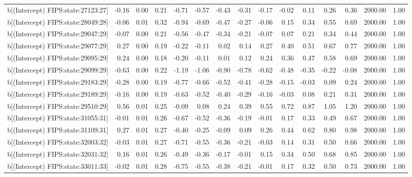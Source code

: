 \begin{table}[ht]
\begin{tabular}{rrrrrrrrrrrrrrr}
  b[(Intercept) FIPS:state:27123:27] & -0.16 & 0.00 & 0.21 & -0.71 & -0.57 & -0.43 & -0.31 & -0.17 & -0.02 & 0.11 & 0.26 & 0.36 & 2000.00 & 1.00 \\ 
  b[(Intercept) FIPS:state:28049:28] & -0.06 & 0.01 & 0.32 & -0.94 & -0.69 & -0.47 & -0.27 & -0.06 & 0.15 & 0.34 & 0.55 & 0.69 & 2000.00 & 1.00 \\ 
  b[(Intercept) FIPS:state:29047:29] & -0.07 & 0.00 & 0.21 & -0.56 & -0.47 & -0.34 & -0.21 & -0.07 & 0.07 & 0.21 & 0.34 & 0.44 & 2000.00 & 1.00 \\ 
  b[(Intercept) FIPS:state:29077:29] & 0.27 & 0.00 & 0.19 & -0.22 & -0.11 & 0.02 & 0.14 & 0.27 & 0.40 & 0.51 & 0.67 & 0.77 & 2000.00 & 1.00 \\ 
  b[(Intercept) FIPS:state:29095:29] & 0.24 & 0.00 & 0.18 & -0.20 & -0.11 & 0.01 & 0.12 & 0.24 & 0.36 & 0.47 & 0.58 & 0.69 & 2000.00 & 1.00 \\ 
  b[(Intercept) FIPS:state:29099:29] & -0.63 & 0.00 & 0.22 & -1.19 & -1.06 & -0.90 & -0.78 & -0.62 & -0.48 & -0.35 & -0.22 & -0.08 & 2000.00 & 1.00 \\ 
  b[(Intercept) FIPS:state:29183:29] & -0.28 & 0.00 & 0.19 & -0.77 & -0.66 & -0.52 & -0.41 & -0.28 & -0.15 & -0.03 & 0.09 & 0.24 & 2000.00 & 1.00 \\ 
  b[(Intercept) FIPS:state:29189:29] & -0.16 & 0.00 & 0.19 & -0.63 & -0.52 & -0.40 & -0.29 & -0.16 & -0.03 & 0.08 & 0.21 & 0.31 & 2000.00 & 1.00 \\ 
  b[(Intercept) FIPS:state:29510:29] & 0.56 & 0.01 & 0.25 & -0.09 & 0.08 & 0.24 & 0.39 & 0.55 & 0.72 & 0.87 & 1.05 & 1.20 & 2000.00 & 1.00 \\ 
  b[(Intercept) FIPS:state:31055:31] & -0.01 & 0.01 & 0.26 & -0.67 & -0.52 & -0.36 & -0.19 & -0.01 & 0.17 & 0.33 & 0.49 & 0.67 & 2000.00 & 1.00 \\ 
  b[(Intercept) FIPS:state:31109:31] & 0.27 & 0.01 & 0.27 & -0.40 & -0.25 & -0.09 & 0.09 & 0.26 & 0.44 & 0.62 & 0.80 & 0.98 & 2000.00 & 1.00 \\ 
  b[(Intercept) FIPS:state:32003:32] & -0.03 & 0.01 & 0.27 & -0.71 & -0.55 & -0.36 & -0.21 & -0.03 & 0.14 & 0.31 & 0.50 & 0.66 & 2000.00 & 1.00 \\ 
  b[(Intercept) FIPS:state:32031:32] & 0.16 & 0.01 & 0.26 & -0.49 & -0.36 & -0.17 & -0.01 & 0.15 & 0.34 & 0.50 & 0.68 & 0.85 & 2000.00 & 1.00 \\ 
  b[(Intercept) FIPS:state:33011:33] & -0.02 & 0.01 & 0.28 & -0.75 & -0.55 & -0.38 & -0.21 & -0.01 & 0.17 & 0.32 & 0.50 & 0.73 & 2000.00 & 1.00 \\ 

\end{tabular}
\end{table}
